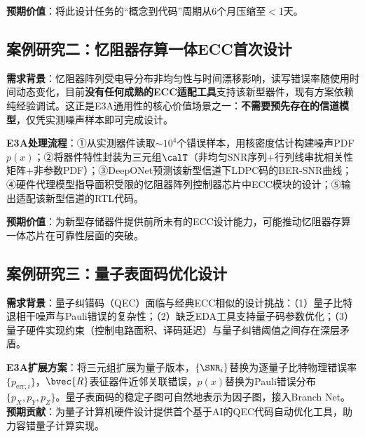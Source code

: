 \textbf{预期价值}：将此设计任务的``概念到代码''周期从6个月压缩至$<$1天。

\subsection{案例研究二：忆阻器存算一体ECC首次设计}

\textbf{需求背景}：忆阻器阵列受电导分布非均匀性与时间漂移影响，读写错误率随使用时间动态变化，目前\textbf{没有任何成熟的ECC适配工具}支持该新型器件，现有方案依赖纯经验调试。这正是E3A通用性的核心价值场景之一：\textbf{不需要预先存在的信道模型}，仅凭实测噪声样本即可完成设计。

\textbf{E3A处理流程}：①从实测器件读取$\sim10^4$个错误样本，用核密度估计构建噪声PDF $p(x)$；②将器件特性封装为三元组$\calT$（非均匀SNR序列+行列线串扰相关性矩阵+非参数PDF）；③DeepONet预测该新型信道下LDPC码的BER-SNR曲线；④硬件代理模型指导面积受限的忆阻器阵列控制器芯片中ECC模块的设计；⑤输出适配该新型信道的RTL代码。

\textbf{预期价值}：为新型存储器件提供前所未有的ECC设计能力，可能推动忆阻器存算一体芯片在可靠性层面的突破。

\subsection{案例研究三：量子表面码优化设计}

\textbf{需求背景}：量子纠错码（QEC）面临与经典ECC相似的设计挑战：（1）量子比特退相干噪声与Pauli错误的复杂性；（2）缺乏EDA工具支持量子码参数优化；（3）量子硬件实现约束（控制电路面积、译码延迟）与量子纠错阈值之间存在深层矛盾。

\textbf{E3A扩展方案}：将三元组扩展为量子版本，$\{\SNR_i\}$替换为逐量子比特物理错误率$\{p_{\mathrm{err},i}\}$，$\bvec{R}$表征器件近邻关联错误，$p(x)$替换为Pauli错误分布$\{p_X, p_Y, p_Z\}$。量子表面码的稳定子图可自然地表示为因子图，接入Branch Net。\textbf{预期贡献}：为量子计算机硬件设计提供首个基于AI的QEC代码自动优化工具，助力容错量子计算实现。